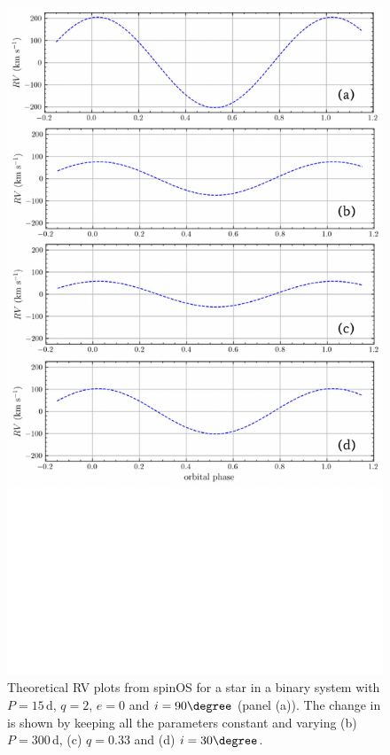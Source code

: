 \begin{figure}
    \centering
    \includegraphics[width=\hsize]{chapters/introduction/image/Thesis_RV.pdf}
    \caption{Theoretical RV plots from spinOS \citep[][]{2021Fabry} for a star in a binary system with $P=15\,$d, $q=2$, $e=0$ and $i=90\degree$ (panel (a)). The change in \DelRV{} is shown by keeping all the parameters constant and varying (b) $P=300\,$d, (c) $q=0.33$ and (d) $i=30\degree$. }
    \label{fig:rv_model}
\end{figure}

